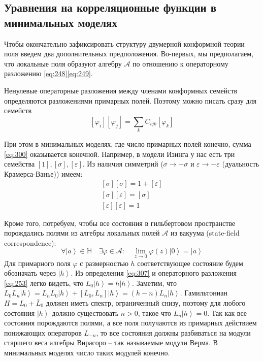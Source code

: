 \documentclass[a4paper,12pt]{article} \usepackage[utf8x]{inputenc} \usepackage[russian]{babel}
\theoremstyle{definition} \newtheorem{corollary}{Corollary}[theorem] \theoremstyle{definition}
\begin{document}
\subsection{Уравнения на корреляционные функции в минимальных моделях}
\label{sec:null-fields}

Чтобы окончательно зафиксировать структуру двумерной конформной теории поля введем два
дополнительных предположения. Во-первых, мы предполагаем, что локальные поля образуют алгебру
$\mathcal{A}$ по отношению к операторному разложению \eqref{eq:248}\eqref{eq:249}.


Ненулевые операторные разложения между членами конформных семейств определяются разложениями
примарных полей. Поэтому можно писать сразу для семейств
\begin{equation}
  \label{eq:300} [\varphi_i][\varphi_j]=\sum_k C_{ijk} [\varphi_k]
\end{equation}

При этом в минимальных моделях, где число примарных полей конечно, сумма \eqref{eq:300} оказывается
конечной. Например, в модели Изинга у нас есть три семейства $[1], [\sigma], [\varepsilon]$. Из
наличия симметрий ($\sigma\to - \sigma$ и $\varepsilon\to -\varepsilon$ (дуальность Крамерса-Ванье))
имеем:
\begin{eqnarray}
  \label{eq:301} \left[\sigma\right]\left[\sigma\right]=1+\left[\varepsilon\right]\\
\left[\sigma\right]\left[\varepsilon\right]=\left[\sigma\right]\\
\left[\varepsilon\right]\left[\varepsilon\right]=1
\end{eqnarray}

Кроме того, потребуем, чтобы все состояния в гильбертовом пространстве порождались полями из алгебры
локальных полей $\mathcal{A}$ из вакуума (state-field correspondence):
\begin{equation}
  \label{eq:307} \forall \left| a\right> \in \mathbb{H}\quad \exists \varphi\in\mathcal{A}:\quad
\lim_{z\to 0}\varphi(z)\left|0\right>=\left|a\right>
\end{equation} Для примарного поля $\varphi$ с размерностью $h$ соответствующее состояние будем
обозначать через $\left|h\right>$. Из определения \eqref{eq:307} и операторного разложения
\eqref{eq:253} легко видеть, что $L_{0}\left|h\right>=h\left|h\right>$. Заметим, что $L_{0}
L_{n}\left|h\right> = L_{n} L_{0}\left|h\right> + [L_{0},L_{n}]\left|h\right> = (h-n)
L_{n}\left|h\right>$. Гамильтониан $H=L_{0}+\bar L_{0}$ должен иметь спектр, ограниченный снизу,
поэтому для любого состояния $\left|h\right>$ должно существовать $n>0$, такое что
$L_{n}\left|h\right> =0 $. Так как все состояния порождаются полями, а все поля получаются из
примарных действием понижающих операторов $L_{-n}$, то все состояния должны разбиваться на модули
старшего веса алгебры Вирасоро -- так называемые модули Верма. В минимальных моделях число таких
модулей конечно.
\end{document}
